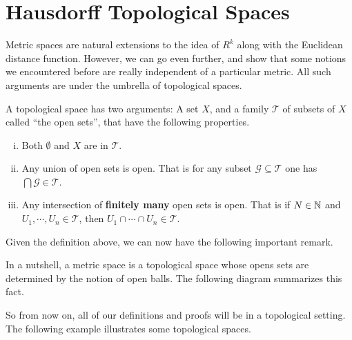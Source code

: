 \section{Hausdorff Topological Spaces}
Metric spaces are natural extensions to the idea of $R^k$ along with the Euclidean distance function. However, we can go even further, and show that some notions we encountered before are really independent of a particular metric. All such arguments are under the umbrella of topological spaces. 

\begin{definition}
	A topological space has two arguments: A set $X$, and a family $\mathcal{T}$ of subsets of $X$ called ``the open sets'', that have the following properties. 
	\begin{enumerate}[(i)]
		\item Both $\emptyset$ and $X$ are in $\mathcal{T}$.
		\item Any union of open sets is open. That is for any subset $\mathcal{G} \subseteq \mathcal{T}$ one has $\bigcap \mathcal{G} \in \mathcal{T}$.
		\item Any intersection of \textbf{finitely many} open sets is open. That is if $N\in \mathbb{N}$ and $U_1, \cdots, U_n \in \mathcal{T}$, then $U_1 \cap \cdots \cap U_n \in \mathcal{T}$.
	\end{enumerate}
\end{definition}

Given the definition above, we can now have the following important remark. 


\begin{remark}
	In a nutshell, a metric space is a topological space whose opens sets are determined by the notion of open balls. The following diagram summarizes this fact.
	
\end{remark}

So from now on, all of our definitions and proofs will be in a topological setting. The following example illustrates some topological spaces.

